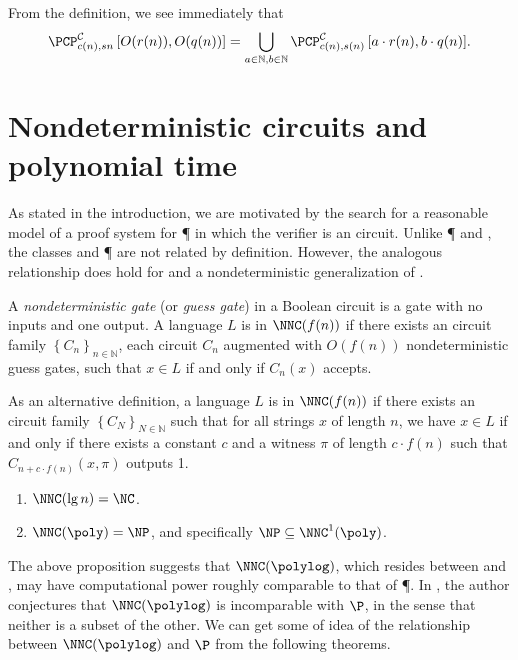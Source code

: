 \documentclass[]{article}
\newcommand{\PCPcs}[5]{\PCP^{#1}_{#2, #3}\left[#4, #5\right]}
\begin{document}
From the definition, we see immediately that
\begin{equation*}
  \PCPcs{\mathcal{C}}{c(n)}{s{n}}{O(r(n))}{O(q(n))} = \bigcup_{a \in \mathbb{N}, b \in \mathbb{N}}{\PCPcs{\mathcal{C}}{c(n)}{s(n)}{a \cdot r(n)}{b \cdot q(n)}}.
\end{equation*}

\section{Nondeterministic \texorpdfstring{\NC}{NC} circuits and polynomial time}\label{sec:nnc}

As stated in the introduction, we are motivated by the search for a reasonable model of a proof system for \P{} in which the verifier is an \NC{} circuit.
Unlike \P{} and \NP{}, the classes \NC{} and \P{} are not related by definition.
However, the analogous relationship does hold for \NC{} and a nondeterministic generalization of \NC{}.
\begin{definition}
  A \emph{nondeterministic gate} (or \emph{guess gate}) in a Boolean circuit is a gate with no inputs and one output.
  A language $L$ is in $\NNC(f(n))$ if there exists an \NC{} circuit family $\left\{C_n\right\}_{n \in \mathbb{N}}$, each circuit $C_n$ augmented with $O(f(n))$ nondeterministic guess gates, such that $x \in L$ if and only if $C_n(x)$ accepts.

  As an alternative definition, a language $L$ is in $\NNC(f(n))$ if there exists an \NC{} circuit family $\left\{C_N\right\}_{N \in \mathbb{N}}$ such that for all strings $x$ of length $n$, we have $x \in L$ if and only if there exists a constant $c$ and a witness $\pi$ of length $c \cdot f(n)$ such that $C_{n + c \cdot f(n)}(x, \pi)$ outputs 1.
\end{definition}

\begin{proposition}\label{prop:nnc}
  \mbox{}
  \begin{enumerate}
  \item $\NNC(\lg n) = \NC$.
  \item $\NNC(\poly) = \NP$, and specifically $\NP \subseteq \NNC^1(\poly)$.
  \end{enumerate}
\end{proposition}

The above proposition suggests that $\NNC(\polylog)$, which resides between \NC{} and \NP, may have computational power roughly comparable to that of \P.
In \cite{wolf94}, the author conjectures that $\NNC(\polylog)$ is incomparable with $\P$, in the sense that neither is a subset of the other.
We can get some of idea of the relationship between $\NNC(\polylog)$ and $\P$ from the following theorems.
\end{document}
